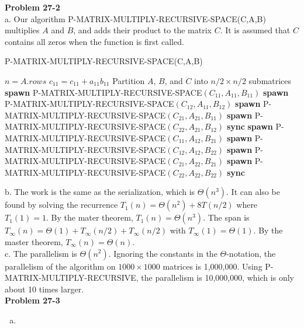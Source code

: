 \documentclass{article}
\begin{document}
\noindent\textbf{Problem 27-2}\\

a. Our algorithm P-MATRIX-MULTIPLY-RECURSIVE-SPACE(C,A,B) multiplies $A$ and $B$, and adds their product to the matrix $C$. It is assumed that $C$ contains all zeros when the function is first called.\\

\begin{algorithm}
\caption{P-MATRIX-MULTIPLY-RECURSIVE-SPACE(C,A,B)}
\begin{algorithmic}[1]
\State $n = A.rows$
	\State $c_11 = c_11 + a_11b_11$
\Else
	\State Partition $A$, $B$, and $C$ into $n/2 \times n/2$ submatrices
	\State \textbf{spawn} P-MATRIX-MULTIPLY-RECURSIVE-SPACE$(C_{11}, A_{11}, B_{11})$
	\State \textbf{spawn} P-MATRIX-MULTIPLY-RECURSIVE-SPACE$(C_{12}, A_{11}, B_{12})$
	\State \textbf{spawn} P-MATRIX-MULTIPLY-RECURSIVE-SPACE$(C_{21}, A_{21}, B_{11})$
	\State \textbf{spawn} P-MATRIX-MULTIPLY-RECURSIVE-SPACE$(C_{22}, A_{21}, B_{12})$
	\State \textbf{sync}
	\State \textbf{spawn} P-MATRIX-MULTIPLY-RECURSIVE-SPACE$(C_{11}, A_{12}, B_{21})$
	\State \textbf{spawn} P-MATRIX-MULTIPLY-RECURSIVE-SPACE$(C_{12}, A_{12}, B_{22})$
	\State \textbf{spawn} P-MATRIX-MULTIPLY-RECURSIVE-SPACE$(C_{21}, A_{22}, B_{21})$
	\State \textbf{spawn} P-MATRIX-MULTIPLY-RECURSIVE-SPACE$(C_{22}, A_{22}, B_{22})$
	\State \textbf{sync}
\EndIf
\end{algorithmic}
\end{algorithm}

b. The work is the same as the serialization, which is $\Theta(n^3)$.  It can also be found by solving the recurrence $T_1(n) = \Theta(n^2) + 8T(n/2) $ where $T_1(1) = 1$.  By the mater theorem, $T_1(n) = \Theta(n^3)$.  The span is $T_\infty(n) = \Theta(1) + T_\infty(n/2) + T_\infty(n/2)$ with $T_\infty(1) = \Theta(1)$.  By the master theorem, $T_\infty(n) = \Theta(n)$. \\

c. The parallelism is $\Theta(n^2)$.  Ignoring the constants in the $\Theta$-notation, the parallelism of the algorithm on $1000 \times 1000$ matrices is 1,000,000.  Using P-MATRIX-MULTIPLY-RECURSIVE, the parallelism is 10,000,000, which is only about 10 times larger. \\



\noindent\textbf{Problem 27-3}\\

\begin{enumerate}[a.]
\item
\end{enumerate}
\end{document}
